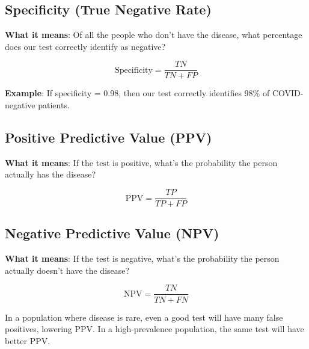 \documentclass[
  11pt,
  letterpaper,
  oneside]{book}
\begin{document}
\subsection{Specificity (True Negative
Rate)}\label{specificity-true-negative-rate}

\textbf{What it means}: Of all the people who don't have the disease,
what percentage does our test correctly identify as negative?

\[\text{Specificity} = \frac{TN}{TN + FP}\]

\textbf{Example}: If specificity = 0.98, then our test correctly
identifies 98\% of COVID-negative patients.

\subsection{Positive Predictive Value
(PPV)}\label{positive-predictive-value-ppv}

\textbf{What it means}: If the test is positive, what's the probability
the person actually has the disease?

\[\text{PPV} = \frac{TP}{TP + FP}\]

\subsection{Negative Predictive Value
(NPV)}\label{negative-predictive-value-npv}

\textbf{What it means}: If the test is negative, what's the probability
the person actually doesn't have the disease?

\[\text{NPV} = \frac{TN}{TN + FN}\]

\begin{tcolorbox}[enhanced jigsaw, toprule=.15mm, left=2mm, opacitybacktitle=0.6, colframe=quarto-callout-warning-color-frame, leftrule=.75mm, titlerule=0mm, coltitle=black, colbacktitle=quarto-callout-warning-color!10!white, toptitle=1mm, title=\textcolor{quarto-callout-warning-color}{\faExclamationTriangle}\hspace{0.5em}{Important: PPV and NPV depend on disease prevalence!}, bottomtitle=1mm, arc=.35mm, rightrule=.15mm, bottomrule=.15mm, breakable, opacityback=0, colback=white]

In a population where disease is rare, even a good test will have many
false positives, lowering PPV. In a high-prevalence population, the same
test will have better PPV.

\end{tcolorbox}
\end{document}
